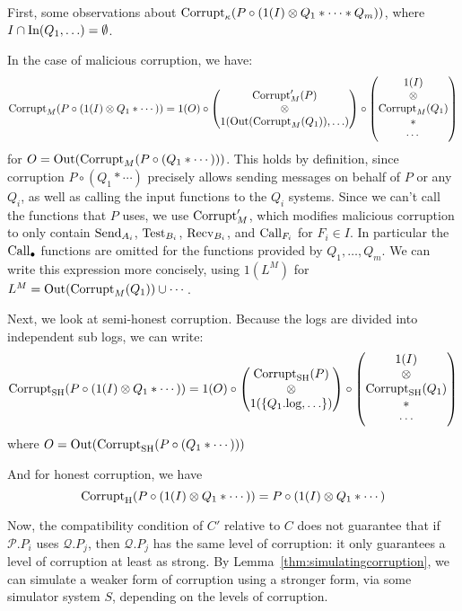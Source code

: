\begin{theorem}
First, some observations about $\text{Corrupt}_\kappa(P \circ (1(I) \otimes Q_1 * \cdots * Q_m))$,
where ${I \cap \text{In}(Q_1, \ldots) = \emptyset}$.

In the case of malicious corruption, we have:
$$
\text{Corrupt}_M(P \circ (1(I) \otimes Q_1 * \cdots)) =
1(O) \circ
\begin{pmatrix}
  \text{Corrupt}'_M(P)\cr
  \otimes\cr
  1(\text{Out}(\text{Corrupt}_M(Q_1)), \ldots)\cr
\end{pmatrix}
\circ
\begin{pmatrix}
  1(I)\cr
  \otimes\cr
  \text{Corrupt}_M(Q_1)\cr
  *\cr
  \cdots\cr
\end{pmatrix}
$$
for $O = \text{Out}(\text{Corrupt}_M(P \circ (Q_1 * \cdots)))$.
This holds by definition, since corruption $P \circ (Q_1 * \cdots)$ precisely allows
sending messages on behalf of $P$ or any $Q_i$, as well as calling
the input functions to the $Q_i$ systems.
Since we can't call the functions that $P$ uses,
we use $\text{Corrupt}'_{M}$, which modifies malicious corruption to only
contain $\text{Send}_{A_i}$, $\text{Test}_{B_i}$, $\text{Recv}_{B_i}$,
and $\text{Call}_{F_i}$ for $F_i \in I$.
In particular the $\text{Call}_{\bullet}$ functions are omitted for the functions
provided by $Q_1, \ldots, Q_m$.
We can write this expression more concisely,
using $1(L^M)$ for $L^M = \text{Out}(\text{Corrupt}_M(Q_1)) \cup \cdots$.

Next, we look at semi-honest corruption.
Because the logs are divided into independent sub logs, we can write:
$$
\text{Corrupt}_{\text{SH}}(P \circ (1(I) \otimes Q_1 * \cdots)) =
1(O) \circ
\begin{pmatrix}
  \text{Corrupt}_{\text{SH}}(P)\cr
  \otimes\cr
  1(\{Q_1.\text{log}, \ldots\})
\end{pmatrix}
\circ
\begin{pmatrix}
  1(I)\cr
  \otimes\cr
  \text{Corrupt}_{\text{SH}}(Q_1)\cr
  *\cr
  \cdots
\end{pmatrix}
$$
where $O = \text{Out}(\text{Corrupt}_{\text{SH}}(P \circ (Q_1 * \cdots)))$

And for honest corruption, we have
$$
\text{Corrupt}_{\text{H}}(P \circ (1(I) \otimes Q_1 * \cdots)) = P \circ (1(I) \otimes Q_1 * \cdots)
$$

Now, the compatibility condition of $C'$ relative to $C$
does not guarantee that if $\mathscr{P}.P_i$ uses $\mathscr{Q}.P_j$,
then $\mathscr{Q}.P_j$ has the same level of corruption: 
it only guarantees a level of corruption at least as strong.
By Lemma~\ref{thm:simulatingcorruption}, we can simulate a weaker
form of corruption using a stronger form, via some simulator system $S$,
depending on the levels of corruption.


\end{theorem}
